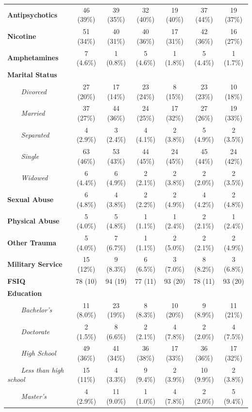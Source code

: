 \begin{table}[t]
\begin{tabular*}{\linewidth}{@{\extracolsep{\fill}}lcccccc}
{\bfseries Antipsychotics} & 46 (39\%) & 39 (35\%) & 32 (40\%) & 19 (40\%) & 37 (44\%) & 19 (37\%) \\ 
{\bfseries Nicotine} & 51 (34\%) & 40 (31\%) & 40 (36\%) & 17 (31\%) & 42 (36\%) & 16 (27\%) \\ 
{\bfseries Amphetamines} & 7 (4.6\%) & 1 (0.8\%) & 5 (4.6\%) & 1 (1.8\%) & 5 (4.4\%) & 1 (1.7\%) \\ 
{\bfseries Marital Status} &  &  &  &  &  &  \\ 
{\itshape     Divorced} & 27 (20\%) & 17 (14\%) & 23 (24\%) & 8 (15\%) & 23 (23\%) & 10 (18\%) \\ 
{\itshape     Married} & 37 (27\%) & 44 (36\%) & 24 (25\%) & 17 (32\%) & 27 (26\%) & 19 (33\%) \\ 
{\itshape     Separated} & 4 (2.9\%) & 3 (2.4\%) & 4 (4.1\%) & 2 (3.8\%) & 5 (4.9\%) & 2 (3.5\%) \\ 
{\itshape     Single} & 63 (46\%) & 53 (43\%) & 44 (45\%) & 24 (45\%) & 45 (44\%) & 24 (42\%) \\ 
{\itshape     Widowed} & 6 (4.4\%) & 6 (4.9\%) & 2 (2.1\%) & 2 (3.8\%) & 2 (2.0\%) & 2 (3.5\%) \\ 
{\bfseries Sexual Abuse} & 6 (4.8\%) & 4 (3.8\%) & 2 (2.2\%) & 2 (4.9\%) & 4 (4.2\%) & 2 (4.8\%) \\ 
{\bfseries Physical Abuse} & 5 (4.0\%) & 5 (4.8\%) & 1 (1.1\%) & 1 (2.4\%) & 2 (2.1\%) & 1 (2.4\%) \\ 
{\bfseries Other Trauma} & 5 (4.0\%) & 7 (6.7\%) & 1 (1.1\%) & 2 (5.0\%) & 2 (2.1\%) & 2 (4.9\%) \\ 
{\bfseries Military Service} & 15 (12\%) & 9 (8.3\%) & 6 (6.5\%) & 3 (7.0\%) & 8 (8.2\%) & 3 (6.8\%) \\ 
{\bfseries FSIQ} & 78 (10) & 94 (19) & 77 (11) & 93 (20) & 78 (11) & 93 (20) \\ 
{\bfseries Education} &  &  &  &  &  &  \\ 
{\itshape     Bachelor's} & 11 (8.0\%) & 23 (19\%) & 8 (8.3\%) & 10 (20\%) & 9 (8.9\%) & 11 (21\%) \\ 
{\itshape     Doctorate} & 2 (1.5\%) & 8 (6.6\%) & 2 (2.1\%) & 4 (7.8\%) & 2 (2.0\%) & 4 (7.5\%) \\ 
{\itshape     High School} & 49 (36\%) & 41 (34\%) & 36 (38\%) & 17 (33\%) & 36 (36\%) & 17 (32\%) \\ 
{\itshape     Less than high school} & 15 (11\%) & 4 (3.3\%) & 9 (9.4\%) & 2 (3.9\%) & 10 (9.9\%) & 2 (3.8\%) \\ 
{\itshape     Master's} & 4 (2.9\%) & 11 (9.0\%) & 1 (1.0\%) & 4 (7.8\%) & 2 (2.0\%) & 5 (9.4\%) \\ 

\end{tabular*}
\end{table}

